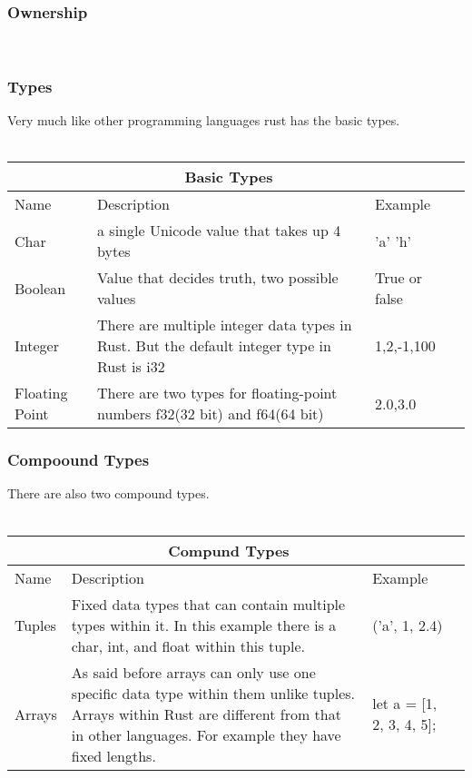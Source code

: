 \documentclass{article}
\theoremstyle{theorem}
\theoremstyle{definition}
\theoremstyle{remark}
\begin{document}
\subsubsection{Ownership}\


\subsubsection{Types}

Very much like other programming languages rust has the basic types. \cite{PDT} 
 \\ 
  \\ 
\begin{center}
\begin{tabular}{ |p{5cm}||p{5cm}|p{5cm}|p{5cm}|  }
 \hline
 \multicolumn{3}{|c|}{Basic Types} \\
 \hline
 Name & Description & Example\\
 \hline
 Char   &  a single Unicode value that takes up 4 bytes
    &'a' 'h' \\
     \hline
 Boolean &  Value that decides truth, two possible values & True or false  \\
  \hline
 Integer &There are multiple integer data types in Rust. But the default integer type in Rust is i32
 & 1,2,-1,100\\
  \hline
 Floating Point    &There are two types for floating-point numbers f32(32 bit) and f64(64 bit) & 2.0,3.0\\
 \hline
\end{tabular}
\end{center}
\subsubsection{Compoound Types}
There are also two compound types. 
 \\ 
  \\ 
\begin{center}
\begin{tabular}{ |p{5cm}||p{5cm}|p{5cm}|p{5cm}|  }
 \hline
 \multicolumn{3}{|c|}{Compund Types} \\
 \hline
 Name & Description & Example\\
 \hline
 Tuples   & Fixed data types that can contain multiple types within it. In this example there is a char, int, and float within this tuple.
    &('a', 1, 2.4) \\
    \hline
 Arrays &  As said before arrays can only use one specific data type within them unlike tuples. Arrays within Rust are different from that in other languages. For example they have fixed lengths. & let a = [1, 2, 3, 4, 5]; \\
  \hline
\end{tabular}
\end{center}
\end{document}
